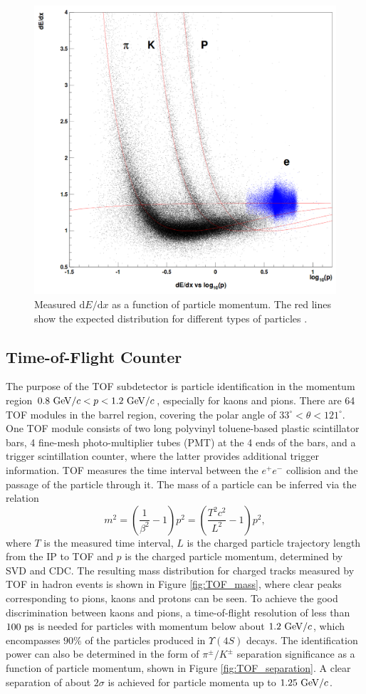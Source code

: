 \begin{figure}[H]
	\centering
	\captionsetup{width=0.8\linewidth}
	\includegraphics[width=0.6\linewidth]{fig/setup/dEdx}
	\caption{Measured $\mathrm{d}E/\mathrm{d}x$ as a function of particle momentum. The red lines show the expected distribution for different types of particles \cite{ABASHIAN2002117}.}
	\label{fig:dEdx}
\end{figure}

\subsection{Time-of-Flight Counter}

The purpose of the TOF subdetector is particle identification in the momentum region $0.8\mathrm{~GeV}/c < p < 1.2\mathrm{~GeV}/c$, especially for kaons and pions. There are 64 TOF modules in the barrel region, covering the polar angle of $33^\circ < \theta < 121^\circ$. One TOF module consists of two long polyvinyl toluene-based plastic scintillator bars, 4 fine-mesh photo-multiplier tubes (PMT) at the 4 ends of the bars, and a trigger scintillation counter, where the latter provides additional trigger information. TOF measures the time interval between the $e^+e^-$ collision and the passage of the particle through it. The mass of a particle can be inferred via the relation
\begin{equation}
m^2 = \left( \frac{1}{\beta^2}-1\right)p^2 = \left( \frac{T^2c^2}{L^2}-1\right)p^2,
\end{equation}
where $T$ is the measured time interval, $L$ is the charged particle trajectory length from the IP to TOF and $p$ is the charged particle momentum, determined by SVD and CDC. The resulting mass distribution for charged tracks measured by TOF in hadron events is shown in Figure \ref{fig:TOF_mass}, where clear peaks corresponding to pions, kaons and protons can be seen. To achieve the good discrimination between kaons and pions, a time-of-flight resolution of less than $100\mathrm{~ps}$ is needed for particles with momentum below about $1.2\mathrm{~GeV}/c$, which encompasses $90\%$ of the particles produced in $\Upsilon(4S)$ decays. The identification power can also be determined in the form of $\pi^\pm/K^\pm$ separation significance as a function of particle momentum, shown in Figure \ref{fig:TOF_separation}. A clear separation of about $2\sigma$ is achieved for particle momenta up to $1.25\mathrm{~GeV}/c$.

